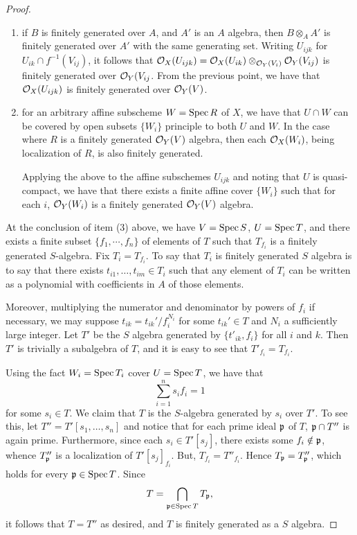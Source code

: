 \begin{proof}
\begin{enumerate}
\item if $B$ is finitely generated over $A$, and $A'$ is an 
$A$ algebra, then $B \otimes_A A'$ is finitely generated over
$A'$ with the same generating set. Writing $U_{ijk}$ for $U_{ik} 
\cap f^{-1}(V_{ij})$, it follows that $\mathcal{O}_X(U_{ijk}) = \mathcal{O}_X(U_{ik})
\otimes_{\mathcal{O}_Y(V_i)} \mathcal{O}_Y(V_{ij})$ is finitely generated over
$\mathcal{O}_Y(V_{ij}$. From the previous point, we have that
$\mathcal{O}_X(U_{ijk})$ is finitely generated over $\mathcal{O}_Y(V)$.

\item for an arbitrary affine subscheme $W = \mathrm{Spec}\, R$ of $X$, we 
have that $U \cap W$ can be covered by open subsets $\{W_i\}$ 
principle to both $U$ and $W$. In the case where $R$ is a finitely
generated $\mathcal{O}_Y(V)$ algebra, then each $\mathcal{O}_X(W_i)$, being 
localization of $R$, is also finitely generated. 

Applying the above to the affine subschemes $U_{ijk}$ and noting
that $U$ is quasi-compact, we have that there exists a finite
affine cover $\{W_i\}$ such that for each $i$, $\mathcal{O}_Y(W_i)$ is a
finitely generated $\mathcal{O}_Y(V)$ algebra.
\end{enumerate}

At the conclusion of item (3) above, we have $V = \mathrm{Spec}\, S$,
$U = \mathrm{Spec}\, T$, and there exists a finite subset $\{f_1,
\cdots, f_n\}$ of elements of $T$ such that $T_{f_i}$ is a
finitely generated $S$-algebra. Fix $T_i = T_{f_i}$. To say
that $T_i$ is finitely generated $S$ algebra is to say that
there exists $t_{i1},\dots,t_{im} \in T_i$ such that any element 
of $T_i$ can be written as a polynomial with coefficients in $A$ 
of those elements. 

Moreover, multiplying the numerator and denominator by powers of 
$f_i$ if necessary, we may suppose $t_{ik} = t_{ik}'/f_i^{N_i}$ for 
some $t_{ik}' \in T$ and $N_i$ a sufficiently large integer. Let
$T'$ be the $S$ algebra generated by $\{t'_{ik}, f_i\}$ for all 
$i$ and $k$. Then $T'$ is trivially a subalgebra of $T$, and it is 
easy to see that $T'_{f_i} = T_{f_i}$.

Using the fact $W_i = \mathrm{Spec}\, T_i$ cover $U = \mathrm{Spec}\, T$, we have that
\[
\sum_{i = 1}^n s_if_i = 1
\]
for some $s_i \in T$. We claim that $T$ is the $S$-algebra 
generated by $s_i$ over $T'$. To see this, let $T'' = T'[s_1, 
\dots,s_n]$ and notice that for each prime ideal $\mathfrak{p}$ of 
$T$, $\mathfrak{p} \cap T''$ is again prime. Furthermore, since 
each $s_i \in T'[s_j]$, there exists some $f_i \notin \mathfrak{p}$, 
whence $T''_{\mathfrak{p}}$ is a localization of $T'[s_j]_{f_i}$. 
But, $T_{f_i} = T''_{f_i}$. Hence $T_{\mathfrak{p}} = T''_{\mathfrak{p}}$,
which holds for every $\mathfrak{p} \in \mathrm{Spec}\, T$. Since 
\[
T = \bigcap_{\mathfrak{p} \in \mathrm{Spec}\, T} T_{\mathfrak{p}},
\] 
it follows that $T = T''$ as desired, and $T$ is finitely 
generated as a $S$ algebra.
\end{proof}

